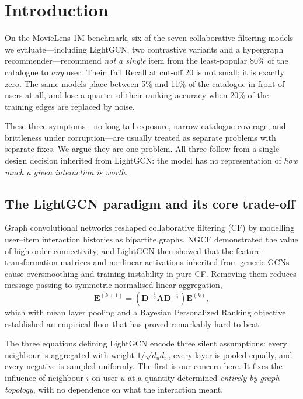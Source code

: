 \documentclass[final,5p,times,twocolumn]{elsarticle}
\begin{document}
\section{Introduction}
\label{sec:intro}

On the MovieLens-1M benchmark, six of the seven collaborative filtering models
we evaluate---including LightGCN, two contrastive variants and a hypergraph
recommender---recommend \emph{not a single} item from the least-popular 80\% of
the catalogue to \emph{any} user. Their Tail Recall at cut-off 20 is not small;
it is exactly zero. The same models place between 5\% and 11\% of the catalogue
in front of users at all, and lose a quarter of their ranking accuracy when
20\% of the training edges are replaced by noise.

These three symptoms---no long-tail exposure, narrow catalogue coverage, and
brittleness under corruption---are usually treated as separate problems with
separate fixes. We argue they are one problem. All three follow from a single
design decision inherited from LightGCN: the model has no representation of
\emph{how much a given interaction is worth}.

\subsection{The LightGCN paradigm and its core trade-off}
\label{sec:paradigm}

Graph convolutional networks reshaped collaborative filtering (CF) by
modelling user--item interaction histories as bipartite graphs. NGCF
\citep{wang2019ngcf} demonstrated the value of high-order connectivity, and
LightGCN \citep{he2020lightgcn} then showed that the feature-transformation
matrices and nonlinear activations inherited from generic GCNs cause
oversmoothing and training instability in pure CF. Removing them reduces
message passing to symmetric-normalised linear aggregation,
\begin{equation}
\mathbf{E}^{(k+1)} = \left( \mathbf{D}^{-\frac{1}{2}} \mathbf{A}
\mathbf{D}^{-\frac{1}{2}} \right) \mathbf{E}^{(k)},
\label{eq:lightgcn}
\end{equation}
which with mean layer pooling and a Bayesian Personalized Ranking objective
\citep{rendle2009bpr} established an empirical floor that has proved
remarkably hard to beat.

The three equations defining LightGCN encode three silent assumptions: every
neighbour is aggregated with weight $1/\sqrt{d_u d_i}$, every layer is pooled
equally, and every negative is sampled uniformly. The first is our concern
here. It fixes the influence of neighbour $i$ on user $u$ at a quantity
determined \emph{entirely by graph topology}, with no dependence on what the
interaction meant.
\end{document}
